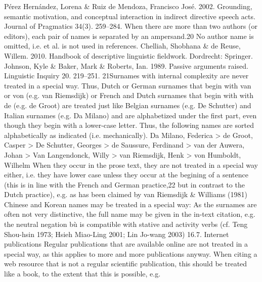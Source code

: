 Pérez Hernández, Lorena \& Ruiz de Mendoza, Francisco José. 2002. Grounding, semantic
motivation, and conceptual interaction in indirect directive speech acts. Journal of
Pragmatics 34(3). 259–284.
When there are more than two authors (or editors), each pair of names is separated by an
ampersand.20 No author name is omitted, i.e. et al. is not used in references.
Chelliah, Shobhana \& de Reuse, Willem. 2010. Handbook of descriptive linguistic fieldwork.
Dordrecht: Springer.
Johnson, Kyle \& Baker, Mark \& Roberts, Ian. 1989. Passive arguments raised. Linguistic
Inquiry 20. 219–251.
21Surnames with internal complexity are never treated in a special way. Thus, Dutch or
German surnames that begin with van or von (e.g. van Riemsdijk) or French and Dutch
surnames that begin with with de (e.g. de Groot) are treated just like Belgian surnames (e.g.
De Schutter) and Italian surnames (e.g. Da Milano) and are alphabetized under the first
part, even though they begin with a lower-case letter. Thus, the following names are sorted
alphabetically as indicated (i.e. mechanically).
Da Milano, Federica > de Groot, Casper > De Schutter, Georges > de Saussure, Ferdinand > van der
Auwera, Johan > Van Langendonck, Willy > van Riemsdijk, Henk > von Humboldt, Wilhelm
When they occur in the prose text, they are not treated in a special way either, i.e. they
have lower case unless they occur at the begining of a sentence (this is in line with the
French and German practice,22 but in contrast to the Dutch practice), e.g.
as has been claimed by van Riemsdijk \& Williams (1981)
Chinese and Korean names may be treated in a special way: As the surnames are often not
very distinctive, the full name may be given in the in-text citation, e.g.
the neutral negation bù is compatible with stative and activity verbs (cf. Teng Shou-hsin 1973; Hsieh
Miao-Ling 2001; Lin Jo-wang 2003)
16.7. Internet publications
Regular publications that are available online are not treated in a special way, as this applies
to more and more publications anyway.
When citing a web resource that is not a regular scientific publication, this should be
treated like a book, to the extent that this is possible, e.g.
	
 	
 	
 	
 	
 	
 	
 	
 	
 	
 	
 	
 	
 	
 	
 	
 	
